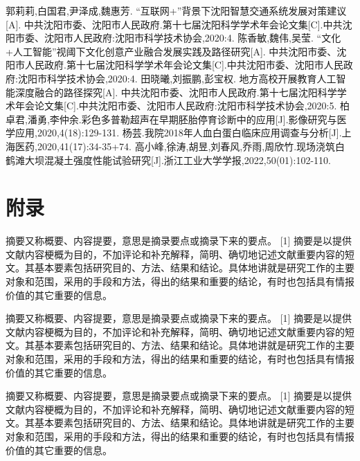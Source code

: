 \documentclass[12pt,oneside,a4paper,fleqn]{ctexart}
\begin{document}
\begin{spacing}{1.25}
\begin{thebibliography}{99}
        郭莉莉,白国君,尹泽成,魏惠芳. “互联网+”背景下沈阳智慧交通系统发展对策建议[A]. 中共沈阳市委、沈阳市人民政府.第十七届沈阳科学学术年会论文集[C].中共沈阳市委、沈阳市人民政府:沈阳市科学技术协会,2020:4.
        陈香敏,魏伟,吴莹. “文化+人工智能”视阈下文化创意产业融合发展实践及路径研究[A]. 中共沈阳市委、沈阳市人民政府.第十七届沈阳科学学术年会论文集[C].中共沈阳市委、沈阳市人民政府:沈阳市科学技术协会,2020:4.
        田晓曦,刘振鹏,彭宝权. 地方高校开展教育人工智能深度融合的路径探究[A]. 中共沈阳市委、沈阳市人民政府.第十七届沈阳科学学术年会论文集[C].中共沈阳市委、沈阳市人民政府:沈阳市科学技术协会,2020:5.
        柏卓君,潘勇,李仲余.彩色多普勒超声在早期胚胎停育诊断中的应用[J].影像研究与医学应用,2020,4(18):129-131.
        杨芸.我院2018年人血白蛋白临床应用调查与分析[J].上海医药,2020,41(17):34-35+74.
        高小峰,徐涛,胡昱,刘春风,乔雨,周欣竹.现场浇筑白鹤滩大坝混凝土强度性能试验研究[J].浙江工业大学学报,2022,50(01):102-110.
        \end{thebibliography}
\end{spacing}\vspace{0.5em} \section*{\heiti 附录} \vspace{0.5em}\begin{spacing}{1.25}
摘要又称概要、内容提要，意思是摘录要点或摘录下来的要点。 [1]  摘要是以提供文献内容梗概为目的，不加评论和补充解释，简明、确切地记述文献重要内容的短文。其基本要素包括研究目的、方法、结果和结论。具体地讲就是研究工作的主要对象和范围，采用的手段和方法，得出的结果和重要的结论，有时也包括具有情报价值的其它重要的信息。

摘要又称概要、内容提要，意思是摘录要点或摘录下来的要点。 [1]  摘要是以提供文献内容梗概为目的，不加评论和补充解释，简明、确切地记述文献重要内容的短文。其基本要素包括研究目的、方法、结果和结论。具体地讲就是研究工作的主要对象和范围，采用的手段和方法，得出的结果和重要的结论，有时也包括具有情报价值的其它重要的信息。

摘要又称概要、内容提要，意思是摘录要点或摘录下来的要点。 [1]  摘要是以提供文献内容梗概为目的，不加评论和补充解释，简明、确切地记述文献重要内容的短文。其基本要素包括研究目的、方法、结果和结论。具体地讲就是研究工作的主要对象和范围，采用的手段和方法，得出的结果和重要的结论，有时也包括具有情报价值的其它重要的信息。


\end{spacing}
\end{document}

